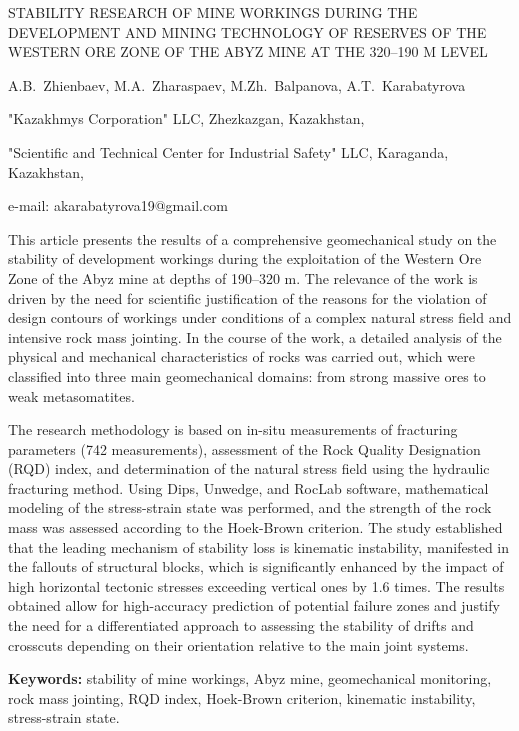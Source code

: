 \begin{header}
STABILITY RESEARCH OF MINE WORKINGS DURING THE DEVELOPMENT AND MINING TECHNOLOGY OF RESERVES OF THE WESTERN ORE ZONE OF THE ABYZ MINE AT THE 320--190 M LEVEL

A.B.~Zhienbaev,
M.A.~Zharaspaev,
M.Zh.~Balpanova,
A.T.~Karabatyrova\envelope
\end{header}

\begin{affil}
"Kazakhmys Corporation" LLC, Zhezkazgan, Kazakhstan,

"Scientific and Technical Center for Industrial Safety" LLC, Karaganda, Kazakhstan,

e-mail: akarabatyrova19@gmail.com
\end{affil}

This article presents the results of a comprehensive geomechanical study
on the stability of development workings during the exploitation of the
Western Ore Zone of the Abyz mine at depths of 190--320 m. The relevance
of the work is driven by the need for scientific justification of the
reasons for the violation of design contours of workings under
conditions of a complex natural stress field and intensive rock mass
jointing. In the course of the work, a detailed analysis of the physical
and mechanical characteristics of rocks was carried out, which were
classified into three main geomechanical domains: from strong massive
ores to weak metasomatites.

The research methodology is based on in-situ measurements of fracturing
parameters (742 measure\-ments), assessment of the Rock Quality
Designation (RQD) index, and determination of the natural stress field
using the hydraulic fracturing method. Using Dips, Unwedge, and RocLab
software, mathematical modeling of the stress-strain state was
performed, and the strength of the rock mass was assessed according to
the Hoek-Brown criterion. The study established that the leading
mechanism of stability loss is kinematic instability, manifested in the
fallouts of structural blocks, which is significantly enhanced by the
impact of high horizontal tectonic stresses exceeding vertical ones by
1.6 times. The results obtained allow for high-accuracy prediction of
potential failure zones and justify the need for a differentiated
approach to assessing the stability of drifts and crosscuts depending on
their orientation relative to the main joint systems.

{\bfseries Keywords:} stability of mine workings, Abyz mine, geomechanical
monitoring, rock mass jointing, RQD index, Hoek-Brown criterion,
kinematic instability, stress-strain state.

